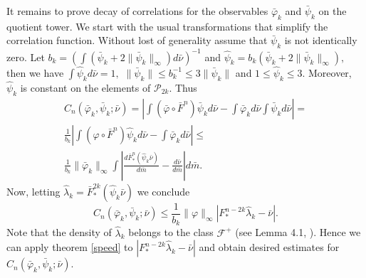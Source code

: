 \documentclass[a4paper,12pt]{amsart}
\numberwithin{equation}{section}
\begin{document}
It remains to prove decay of correlations for the observables
$\bar\varphi_k$ and $\bar\psi_k$ on the quotient tower. We start
with the usual transformations that simplify the correlation
function. Without lost of generality assume that $\bar\psi_k$ is not
identically zero. Let
$b_k=\left(\int(\bar\psi_k+2\|\bar\psi_k\|_{\infty})d\bar\nu\right)^{-1}$
and $\hat\psi_k=b_k(\bar\psi_k+2\|\bar\psi_k\|_\infty),$ then we
have $\int\hat\psi_kd\bar\nu=1,$  $\|\bar\psi_k\|\le b_k^{-1}\le
3\|\bar\psi_k\|$ and $1\le \hat\psi_k\le 3.$ Moreover, $\hat\psi_k$
is constant on the elements of $\mathcal P_{2k}.$ Thus
\begin{equation}\begin{split} C_n(\bar\varphi_k, \bar\psi_k; \bar\nu)=
\left|\int(\bar\varphi\circ \bar
F^n)\bar\psi_kd\bar\nu-\int\bar\varphi_kd\bar\nu
\int\bar\psi_kd\bar\nu\right|= \\
\frac{1}{b_k}\left|\int(\varphi\circ \bar
F^n)\hat\psi_kd\bar\nu-\int\bar\varphi_kd\bar\nu \right|\le\\
\frac{1}{b_k}\|\bar\varphi_k\|_{\infty}\int \left| \frac{d\bar
F_\ast^n(\hat\psi_k\bar\nu)}{d\bar m}-\frac{d\bar\nu}{d\bar
m}\right|d\bar m.
\end{split} \end{equation}
Now, letting $\hat\lambda_k=\bar F^{2k}_\ast(\hat\psi_k\bar\nu)$ we
conclude \begin{equation}\label{ineq}
 C_n(\bar\varphi_k, \bar\psi_k; \bar\nu)\le
\frac{1}{b_k}\|\varphi\|_\infty\left|F^{n-2k}_\ast\hat\lambda_k-\bar\nu\right|.
\end{equation} Note that  the density of $\hat\lambda_k$ belongs to the class
$\mathcal F^+$ (see Lemma 4.1, \cite{AlvPin}). Hence we can apply
 theorem \ref{speed}  to
 $\left|F^{n-2k}_\ast\hat\lambda_k-\bar\nu\right|$   and
 obtain desired estimates for  $C_n(\bar\varphi_k, \bar\psi_k;
\bar\nu).$
\end{document}
